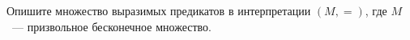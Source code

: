 Опишите множество выразимых предикатов в интерпретации $(M, =)$, где $M$~--- призвольное бесконечное
множество.

